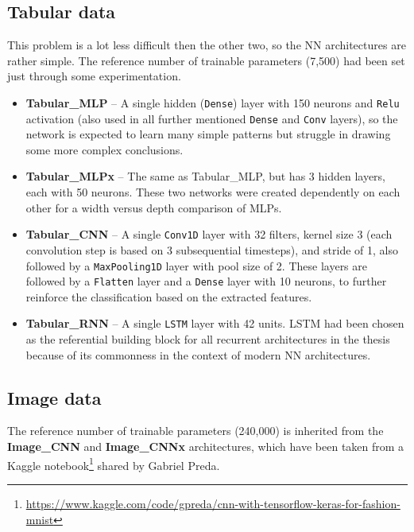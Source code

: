 \subsection{Tabular data}
\label{architectures-tabular}
This problem is a lot less difficult then the other two, so the NN architectures are rather simple.
The reference number of trainable parameters (7,500) had been set just through some experimentation.

\begin{itemize}
    \item \textbf{Tabular\_MLP} -- A single hidden (\texttt{Dense}) layer with 150 neurons and
    \texttt{Relu} activation (also used in all further mentioned \texttt{Dense} and \texttt{Conv}
    layers), so the network is expected to learn many simple patterns but struggle in drawing
    some more complex conclusions.
    \item \textbf{Tabular\_MLPx} -- The same as Tabular\_MLP, but has 3 hidden layers, each with 50 neurons.
    These two networks were created dependently on each other for a width versus depth comparison of MLPs.
    \item \textbf{Tabular\_CNN} -- A single \texttt{Conv1D} layer with 32 filters, kernel size 3 (each convolution step is based on 3 subsequential timesteps), and stride of 1, also followed by a \texttt{MaxPooling1D} layer
    with pool size of 2. These layers are followed by a \texttt{Flatten} layer and a \texttt{Dense} layer
    with 10 neurons, to further reinforce the classification based on the extracted features.
    \item \textbf{Tabular\_RNN} -- A single \texttt{LSTM} layer with 42 units. LSTM had been
    chosen as the referential building block for all recurrent architectures in the thesis because
    of its commonness in the context of modern NN architectures.
\end{itemize}


\subsection{Image data}
\label{architectures-image}
The reference number of trainable parameters (240,000) is inherited from the \textbf{Image\_CNN} and
\textbf{Image\_CNNx} architectures, which have been taken from a Kaggle
notebook\footnote{\url{https://www.kaggle.com/code/gpreda/cnn-with-tensorflow-keras-for-fashion-mnist}}
shared by Gabriel Preda.

